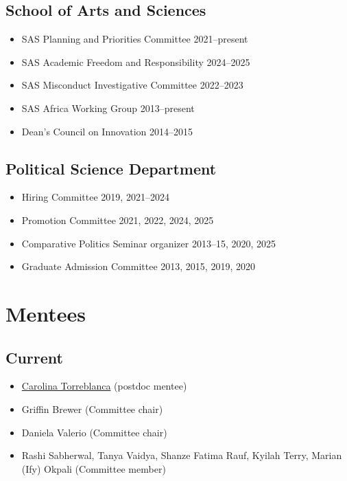 \documentclass[10pt,a4paper]{article}
\begin{document}
\subsection*{School of Arts and Sciences}
\begin{itemize}[leftmargin=1em, itemsep=1pt, topsep=2pt, label=\textcolor{secondary}{$\bullet$}]
\item SAS Planning and Priorities Committee \hfill \textcolor{secondary}{2021--present}
\item SAS Academic Freedom and Responsibility \hfill \textcolor{secondary}{2024--2025}
\item SAS Misconduct Investigative Committee \hfill \textcolor{secondary}{2022--2023}
\item SAS Africa Working Group \hfill \textcolor{secondary}{2013--present}
\item Dean's Council on Innovation \hfill \textcolor{secondary}{2014--2015}
\end{itemize}

\subsection*{Political Science Department}
\begin{itemize}[leftmargin=1em, itemsep=1pt, topsep=2pt, label=\textcolor{secondary}{$\bullet$}]
\item Hiring Committee \hfill \textcolor{secondary}{2019, 2021--2024}
\item Promotion Committee \hfill \textcolor{secondary}{2021, 2022, 2024, 2025}
\item Comparative Politics Seminar organizer \hfill \textcolor{secondary}{2013--15, 2020, 2025}
\item Graduate Admission Committee \hfill \textcolor{secondary}{2013, 2015, 2019, 2020}
\end{itemize}

\section{Mentees}

\subsection*{Current}
\begin{itemize}[leftmargin=1em, itemsep=1pt, topsep=2pt, label=\textcolor{secondary}{$\bullet$}]
\item \href{https://carolina-torreblanca.github.io/}{Carolina Torreblanca} (postdoc mentee)
\item Griffin Brewer (Committee chair)
\item Daniela Valerio (Committee chair)
\item Rashi Sabherwal, Tanya Vaidya, Shanze Fatima Rauf, Kyilah Terry, Marian (Ify) Okpali (Committee member)
\end{itemize}
\end{document}
